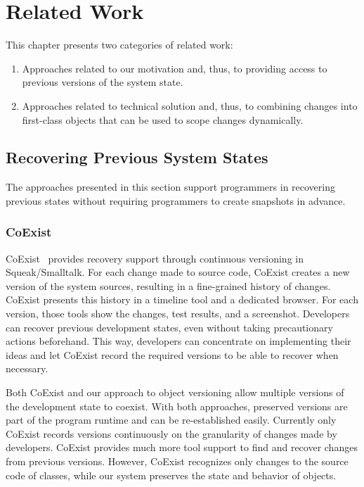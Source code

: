 \chapter{Related Work} \label{chapter:RELATED_WORK}

This chapter presents two categories of related work:

\begin{enumerate}
    \item Approaches related to our motivation and, thus, to providing access to previous versions of the system state.
    \item Approaches related to technical solution and, thus, to combining changes into first-class objects that can be used to scope changes dynamically.
\end{enumerate}


\section{Recovering Previous System States}

The approaches presented in this section support programmers in recovering previous states without requiring programmers to create snapshots in advance.


\subsection{CoExist}

CoExist~\cite{Steinert2012COE} provides recovery support through continuous versioning in Squeak/Smalltalk.
For each change made to source code, CoExist creates a new version of the system sources, resulting in a fine-grained history of changes.
CoExist presents this history in a timeline tool and a dedicated browser.
For each version, those tools show the changes, test results, and a screenshot.
Developers can recover previous development states, even without taking precautionary actions beforehand.
This way, developers can concentrate on implementing their ideas and let CoExist record the required versions to be able to recover when necessary.

Both CoExist and our approach to object versioning allow multiple versions of the development state to coexist.
With both approaches, preserved versions are part of the program runtime and can be re-established easily.
Currently only CoExist records versions continuously on the granularity of changes made by developers.
CoExist provides much more tool support to find and recover changes from previous versions.
However, CoExist recognizes only changes to the source code of classes, while our system preserves the state and behavior of objects.


